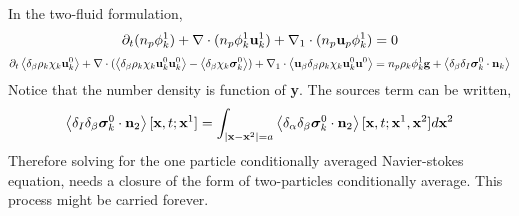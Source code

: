 In the two-fluid formulation, 
\begin{equation}
    \partial_t (n_p \phi_k^1)
    +  \mathbf{\nabla}\cdot (n_p\phi_k^1\textbf{u}_k^1)
    +  \mathbf{\nabla}_1 \cdot
    (n_p \textbf{u}_p\phi_k^1)
    = 0
\end{equation}
\begin{equation}
    \partial_t \left<\delta_\beta \rho_k \chi_k \textbf{u}_k^0 \right>
    + \mathbf{\nabla}\cdot(
        \left<\delta_\beta \rho_k \chi_k \textbf{u}_k^0 \textbf{u}^0_k  \right>
    - \left<\delta_\beta\chi_k\bm\sigma^0_k\right>)
    + \mathbf{\nabla}_1 \cdot
        \left<\textbf{u}_\beta\delta_\beta \rho_k \chi_k \textbf{u}_k^0 \textbf{u}^0\right>
    = n_p  \rho_k \phi_k^1 \textbf{g} 
    + \left<\delta_\beta\delta_I \bm\sigma_k^0 \cdot \textbf{n}_k\right>
\end{equation}
Notice that the number density is function of \textbf{y}. 
The sources term can be written, 
\begin{equation*}
    \left<\delta_I\delta_\beta \bm\sigma_k^0 \cdot \textbf{n}_2\right>[\textbf{x},t;\textbf{x}^1]
    = \int_{|\textbf{x}-\textbf{x}^2| = a}
    \left<\delta_\alpha\delta_\beta \bm\sigma_k^0 \cdot \textbf{n}_2\right>[\textbf{x},t;\textbf{x}^1,\textbf{x}^2] d\textbf{x}^2
\end{equation*}
Therefore solving for the one particle conditionally averaged Navier-stokes equation, needs a closure of the form of two-particles conditionally average. 
This process might be carried forever. 
